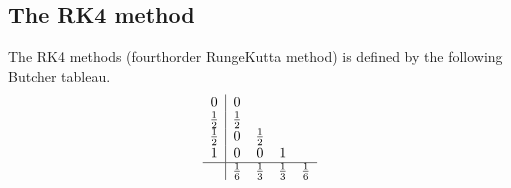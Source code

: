 \documentclass[letterpaper,10pt,english]{jupyterBook}
\begin{document}
\subsection{The RK4 method}
\label{\detokenize{8_Appendices/8.1_Python:the-rk4-method}}
\sphinxAtStartPar
The RK4 methods (fourth\sphinxhyphen{}order Runge\sphinxhyphen{}Kutta method) is defined by the following Butcher tableau.
\begin{align*}
    \begin{array}{c|cccc}
        0 & 0 \\
        \frac{1}{2} & \frac{1}{2} \\
        \frac{1}{2} & 0 & \frac{1}{2} \\
        1 & 0 & 0 & 1 \\ \hline
        & \frac{1}{6} & \frac{1}{3} & \frac{1}{3} & \frac{1}{6}
    \end{array}
\end{align*}
\end{document}
